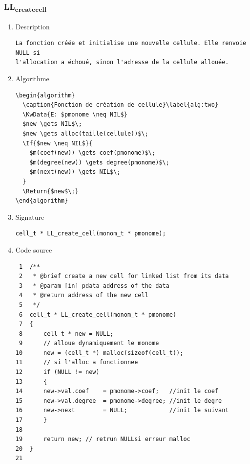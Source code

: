 \documentclass[11pt]{article}
\begin{document}
\subsubsection{LL\textsubscript{create}\textsubscript{cell}}
\label{sec:orgfa2b847}
\begin{enumerate}
\item Description
\label{sec:orgba9c0ab}

\begin{verbatim}
La fonction créée et initialise une nouvelle cellule. Elle renvoie NULL si
l'allocation a échoué, sinon l'adresse de la cellule allouée.
\end{verbatim}

\item Algorithme
\label{sec:org0d4401a}

\begin{verbatim}
\begin{algorithm}
  \caption{Fonction de création de cellule}\label{alg:two}
  \KwData{E: $pmonome \neq NIL$}
  $new \gets NIL$\;
  $new \gets alloc(taille(cellule))$\;
  \If{$new \neq NIL$}{
    $m(coef(new)) \gets coef(pmonome)$\;
    $m(degree(new)) \gets degree(pmonome)$\;
    $m(next(new)) \gets NIL$\;
  }
  \Return{$new$\;}
\end{algorithm}
\end{verbatim}

\item Signature
\label{sec:orgb8cdc11}

\begin{verbatim}
cell_t * LL_create_cell(monom_t * pmonome);
\end{verbatim}

\item Code source
\label{sec:orge8ce3de}

\begin{verbatim}
 1  /** 
 2   * @brief create a new cell for linked list from its data 
 3   * @param [in] pdata address of the data
 4   * @return address of the new cell
 5   */
 6  cell_t * LL_create_cell(monom_t * pmonome)
 7  {
 8      cell_t * new = NULL;
 9      // alloue dynamiquement le monome
10      new = (cell_t *) malloc(sizeof(cell_t));
11      // si l'alloc a fonctionnee 
12      if (NULL != new)
13      {
14  	new->val.coef    = pmonome->coef;   //init le coef
15  	new->val.degree  = pmonome->degree; //init le degre
16  	new->next        = NULL;            //init le suivant
17      }
18  
19      return new; // retrun NULLsi erreur malloc
20  }
21  
\end{verbatim}


\end{enumerate}
\end{document}
